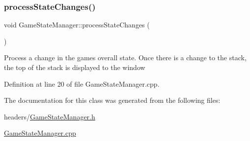 \subsubsection{\texorpdfstring{processStateChanges()}{processStateChanges()}}
{\footnotesize\ttfamily void Game\+State\+Manager\+::process\+State\+Changes (\begin{DoxyParamCaption}{ }\end{DoxyParamCaption})}

Process a change in the games overall state. Once there is a change to the stack, the top of the stack is displayed to the window 

Definition at line 20 of file Game\+State\+Manager.\+cpp.



The documentation for this class was generated from the following files\+:\begin{DoxyCompactItemize}
\item 
headers/\mbox{\hyperlink{_game_state_manager_8h}{Game\+State\+Manager.\+h}}\item 
\mbox{\hyperlink{_game_state_manager_8cpp}{Game\+State\+Manager.\+cpp}}\end{DoxyCompactItemize}
